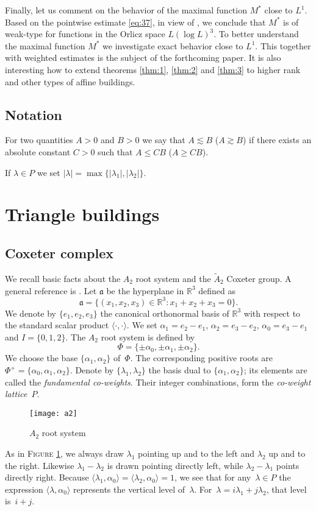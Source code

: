 \documentclass[a4paper]{amsart}
\newcommand{\defn}[1]{\emph{#1}}
\newcommand{\sprod}[2]{{\langle #1, #2\rangle}}
\newcommand{\abs}[1]{{\lvert {#1} \rvert}}
\newcommand{\RR}{\mathbb{R}}
\theoremstyle{plain}
\theoremstyle{definition}
\theoremstyle{remark}
\numberwithin{equation}{section}
\newcounter{thm}
\theoremstyle{plain}
\begin{document}
Finally, let us comment on the behavior of the maximal function $M^*$ close to $L^1$. Based on the pointwise estimate
\eqref{eq:37}, in view of \cite{hl}, we conclude that $M^*$ is of weak-type for functions in the Orlicz space
$L (\log L)^3$. To better understand the maximal function $M^*$ we investigate exact behavior close to $L^1$. This
together with weighted estimates is the subject of the forthcoming paper. It is also interesting how to extend
theorems \ref{thm:1}, \ref{thm:2} and \ref{thm:3} to higher rank and other types of affine buildings.
 
\subsection{Notation}
For two quantities $A>0$ and $B>0$ we say that $A \lesssim B$ ($A \gtrsim B$) if there exists 
an absolute constant $C>0$ such that $A\le CB$ ($A\ge CB$).

If $\lambda \in P$ we set $\abs{\lambda} = \max\{ \abs{\lambda_1}, \abs{\lambda_2}\}$.

\section{Triangle buildings}
\label{sec:2}
\subsection{Coxeter complex}
We recall basic facts about the $A_2$ root system and the
$\tilde{A}_2$ Coxeter group.  A general reference is \cite{bour}.  Let
$\mathfrak{a}$ be the hyperplane in $\RR^3$ defined as
\begin{equation*}
\mathfrak{a} = \{(x_1, x_2, x_3) \in \RR^3: x_1 + x_2 + x_3 = 0 \}.
\end{equation*}
We denote by $\{e_1, e_2, e_3\}$ the canonical orthonormal basis of
$\RR^3$ with respect to the standard scalar product
$\sprod{\cdot}{\cdot}$. We set $\alpha_1 = e_2 - e_1$, $\alpha_2 = e_3
- e_2$, $\alpha_0 = e_3 - e_1$ and $I = \{0, 1, 2 \}$. The $A_2$ root
system is defined by
\begin{equation*}
	\Phi = \{\pm\alpha_0, \pm \alpha_1, \pm \alpha_2\}.
\end{equation*}
We choose the base $\{\alpha_1, \alpha_2\}$ of~$\Phi$.  The
corresponding positive roots are $\Phi^+ = \{\alpha_0, \alpha_1,
\alpha_2\}$. Denote by $\{\lambda_1, \lambda_2\}$ the basis dual to
$\{\alpha_1, \alpha_2\}$; its elements are called the
\defn{fundamental co-weights}. Their integer combinations, form the
\defn{co-weight lattice}~$P$.
\begin{figure}[h]
	\texttt{[image: a2]}
	\caption{$A_2$ root system}
        \label{fig:1}
\end{figure}
As in \textsc{Figure \ref{fig:1}}, we always draw $\lambda_1$ pointing
up and to the left and $\lambda_2$ up and to the right.  Likewise
$\lambda_1-\lambda_2$ is drawn pointing directly left, while
$\lambda_2-\lambda_1$ points directly right.  Because
$\sprod{\lambda_1}{\alpha_0}=\sprod{\lambda_2}{\alpha_0}=1$,
we see that for any~$\lambda\in P$ the expression
$\sprod{\lambda}{\alpha_0}$ represents the vertical level
of~$\lambda$.  For~$\lambda=i\lambda_1+j\lambda_2$, that level
is~$i+j$.
\end{document}
